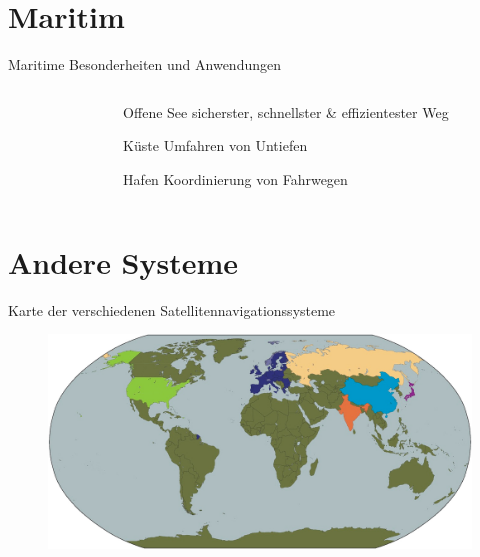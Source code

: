 \section{Maritim}

\begin{frame}{Maritime Besonderheiten und Anwendungen}
    \begin{columns}
        \begin{column}{0.2\textwidth}
            ~
        \end{column}
        \begin{column}{0.8\textwidth}
            \begin{itemize}
                \item[Offene See] sicherster, schnellster \& effizientester Weg
                \item[Küste] Umfahren von Untiefen
                \item[Hafen] Koordinierung von Fahrwegen
            \end{itemize}
        \end{column}
    \end{columns}
\end{frame}

\section{Andere Systeme}
\begin{frame}{Karte der verschiedenen Satellitennavigationssysteme}
    \begin{figure}
        \centering
        \includegraphics[width=\textwidth]{images/international_systems_map.jpg}
    \end{figure}
    \centering{\small [TimeAndNavigation]}
\end{frame}
